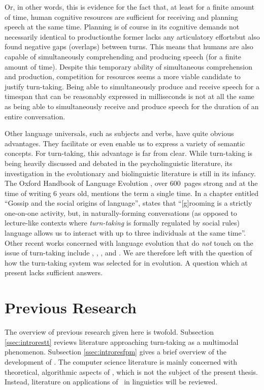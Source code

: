 Or, in other words, this is evidence for the fact that, at least for a finite amount of time, human cognitive resources are sufficient for receiving and planning speech at the same time.
Planning is of course in its cognitive demands not necessarily identical to production\dash the former lacks any articulatory efforts\dash but \citet{levinson_timing_2015} also found negative gaps (overlaps) between turns. This means that humans are also capable of simultaneously comprehending and producing speech (for a finite amount of time).
Despite this temporary ability of simultaneous comprehension and production, competition for resources seems a more viable candidate to justify turn-taking.
Being able to simultaneously produce and receive speech for a timespan that can be reasonably expressed in milliseconds is not at all the same as being able to simultaneously receive and produce speech for the duration of an entire conversation.

Other language universals, such as subjects and verbs, have quite obvious advantages.
They facilitate or even enable us to express a variety of semantic concepts.
For turn-taking, this advantage is far from clear.
While turn-taking is being heavily discussed and debated in the psycholinguistic literature, its investigation in the evolutionary and biolinguistic literature is still in its infancy.
The Oxford Handbook of Language Evolution \citep{tallerman_oxford_2012}, over 600~pages strong and at the time of writing 6 years old, mentions the term a single time.
In a chapter entitled ``Gossip and the social origins of language'', \citet[, emphasis mine]{dunbar_gossip_2012} states that ``[g]rooming is a strictly one-on-one activity, but, in naturally-forming conversations (as opposed to lecture-like contexts where \emph{turn-taking} is formally regulated by social rules) language allows us to interact with up to three individuals at the same time''.
Other recent works concerned with language evolution that do \emph{not} touch on the issue of turn-taking include \citet{berwick_why_2016}, \citet{bolhuis_birdsong_2013}, \citet{friederici_language_2017}, and \citet{jenkins_biolinguistics_2000}.
We are therefore left with the question of how the turn-taking system was selected for in evolution.
A question which at present lacks sufficient answers.


\section{Previous Research}
\label{sec:introres}
The overview of previous research given here is twofold. Subsection \ref{ssec:introrestt} reviews literature approaching turn-taking as a multimodal phenomenon.
Subsection \ref{ssec:introresfpm} gives a brief overview of the development of \fpmlower.
The computer science literature is mainly concerned with theoretical, algorithmic aspects of \fpmlower, which is not the subject of the present thesis.
Instead, literature on applications of \fpmlower\ in linguistics will be reviewed.



